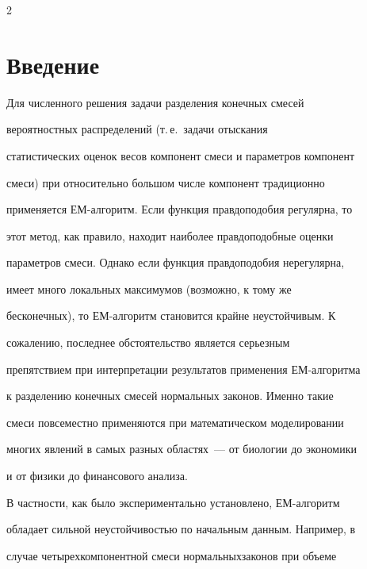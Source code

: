       \begin{multicols}{2}





      \label{st\stat}





\section{Введение}





Для численного решения задачи разделения конечных смесей


вероятностных распределений (т.\,е.\ задачи отыскания


статистических оценок весов компонент смеси и параметров компонент


смеси) при относительно большом числе компонент традиционно


применяется ЕМ-алгоритм. Если функция правдоподобия регулярна, то


этот метод, как правило, находит наиболее правдоподобные оценки


параметров смеси. Однако если функция правдоподобия нерегулярна,


имеет много локальных максимумов (возможно, к тому же


бесконечных), то ЕМ-алгоритм становится крайне неустойчивым. К


сожалению, последнее обстоятельство является серьезным


препятствием при интерпретации результатов применения ЕМ-алгоритма


к разделению конечных смесей нормальных законов. Именно такие


смеси повсеместно применяются при математическом моделировании


многих явлений в самых разных областях~--- от биологии до экономики


и от физики до финансового анализа.





В частности, как было экспериментально установлено, ЕМ-алгоритм


обладает сильной неустойчивостью по начальным данным. Например, в


случае четырехкомпонентной смеси нормальных\linebreak законов при объеме



\end{multicols}
